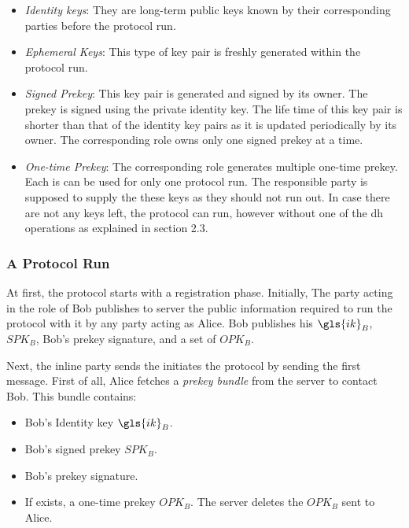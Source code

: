 \begin{itemize}
	\item \textit{Identity keys}: They are long-term public keys known by their corresponding parties before the protocol run.
	\item \textit{Ephemeral Keys}: This type of key pair is freshly generated within the protocol run.
	\item \textit{Signed Prekey}: This key pair is generated and signed by its owner. The prekey is signed using the private identity key. The life time of this key pair is shorter than that of the identity key pairs as it is updated periodically by its owner. The corresponding role owns only one signed prekey at a time.
	\item \textit{One-time Prekey}: The corresponding role generates multiple one-time prekey. Each is can be used for only one protocol run. The responsible party is supposed to supply the these keys as they should not run out. In case there are not any keys left, the protocol can run, however without one of the \gls{dh} operations as explained in section 2.3.
\end{itemize}

\subsubsection{A Protocol Run}
At first, the protocol starts with a registration phase. Initially, The party acting in the role of Bob publishes to server the public information required to run the protocol with it by any party acting as Alice. Bob publishes his $ \gls{ik}_{B} $, $ SPK_{B} $, Bob's prekey signature, and a set of $ OPK_{B} $.

\par
Next, the inline party sends the initiates the protocol by sending the first message. First of all, Alice fetches a \textit{prekey bundle} from the server to contact Bob. This bundle contains:
\begin{itemize}
	\item Bob's Identity key $ \gls{ik}_{B} $.
	\item Bob's signed prekey $ SPK_{B} $.
	\item Bob's prekey signature.
	\item If exists, a one-time prekey $ OPK_{B} $. The server deletes the $ OPK_{B} $ sent to Alice.
\end{itemize}

